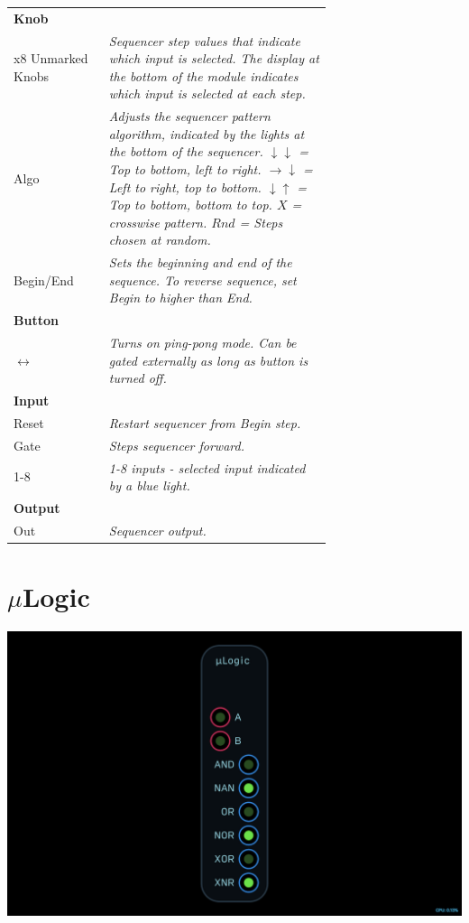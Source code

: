 \documentclass[11pt]{book}
\begin{document}
\begin{table}[ht]
\small
\sffamily
\renewcommand\arraystretch{1.5}
\centering
\begin{tabular}{l*{1}{>{\raggedright\arraybackslash}p{0.7\linewidth}}}

\toprule
\textbf{Knob} \\
x8 Unmarked Knobs & \textit{Sequencer step values that indicate which input is selected. The display at the bottom of the module indicates which input is selected at each step.} \\
Algo & \textit{Adjusts the sequencer pattern algorithm, indicated by the lights at the bottom of the sequencer. $\downarrow \downarrow$ = Top to bottom, left to right. $\rightarrow \downarrow$ = Left to right, top to bottom. $\downarrow \uparrow$ = Top to bottom, bottom to top. $X$ = crosswise pattern. $Rnd$ = Steps chosen at random.} \\
Begin/End & \textit{Sets the beginning and end of the sequence. To reverse sequence, set Begin to higher than End.} \\

\midrule
\textbf{Button} \\
$\leftrightarrow$ & \textit{Turns on ping-pong mode. Can be gated externally as long as button is turned off.} \\

\midrule
\textbf{Input} \\
Reset & \textit{Restart sequencer from Begin step.} \\
Gate & \textit{Steps sequencer forward.} \\
1-8 & \textit{1-8 inputs - selected input indicated by a blue light.} \\

\midrule
\textbf{Output} \\
Out & \textit{Sequencer output.} \\

\bottomrule
\end{tabular}
\end{table}%

\pagebreak


\section{$\mu$Logic}

\includegraphics[width=\textwidth]{ulogic.png}
\end{document}

